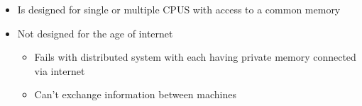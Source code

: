 \documentclass[12pt]{article}
\begin{document}
\begin{itemize}
\begin{itemize}
\begin{itemize}
\begin{itemize}
            \end{itemize}
            \item Is designed for single or multiple CPUS with access to a common
            memory
            \item Not designed for the age of internet
            \begin{itemize}
                \item Fails with distributed system with each having private memory
                connected via internet
                \item Can't exchange information between machines
            \end{itemize}
        \end{itemize}
    \end{itemize}
\end{itemize}

\bigskip
\end{document}
